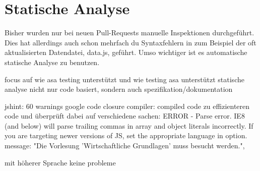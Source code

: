 \documentclass[ngerman]{article}
\begin{document}
\section{Statische Analyse}

Bisher wurden nur bei neuen Pull-Requests manuelle Inspektionen durchgeführt. Dies hat allerdings auch schon mehrfach du Syntaxfehlern in zum Beispiel der oft aktualisierten Datendatei, data.js, geführt. Umso wichtiger ist es automatische statische Analyse zu benutzen.

focus auf wie asa testing unterstützt und wie testing asa unterstützt
statische analyse nicht nur code basiert, sondern auch spezifikation/dokumentation

jshint: 60 warnings
google code closure compiler: compiled code zu effizienteren code und überprüft dabei auf verschiedene sachen:
 ERROR - Parse error. IE8 (and below) will parse trailing commas in array and object literals incorrectly. If you are targeting newer versions of JS, set the appropriate language in option.
	message: "Die Vorlesung 'Wirtschaftliche Grundlagen' muss besucht werden.",
	
	mit höherer Sprache keine probleme
\end{document}
